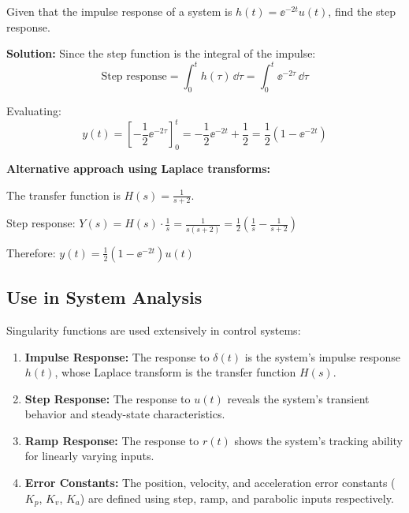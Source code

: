 \begin{examplebox}[title=Example 10.2: Using Singularity Function Relationships]
Given that the impulse response of a system is $h(t) = \ee^{-2t}u(t)$, find the step response.

\textbf{Solution:}
Since the step function is the integral of the impulse:
\begin{equation}
\text{Step response} = \int_0^t h(\tau) \, \dd\tau = \int_0^t \ee^{-2\tau} \, \dd\tau
\end{equation}

Evaluating:
\begin{equation}
y(t) = \left[-\frac{1}{2}\ee^{-2\tau}\right]_0^t = -\frac{1}{2}\ee^{-2t} + \frac{1}{2} = \frac{1}{2}(1 - \ee^{-2t})
\end{equation}

\textbf{Alternative approach using Laplace transforms:}

The transfer function is $H(s) = \frac{1}{s+2}$.

Step response: $Y(s) = H(s) \cdot \frac{1}{s} = \frac{1}{s(s+2)} = \frac{1}{2}\left(\frac{1}{s} - \frac{1}{s+2}\right)$

Therefore: $\boxed{y(t) = \frac{1}{2}(1 - \ee^{-2t})u(t)}$
\end{examplebox}

\subsection{Use in System Analysis}

Singularity functions are used extensively in control systems:

\begin{enumerate}
    \item \textbf{Impulse Response:} The response to $\delta(t)$ is the system's impulse response $h(t)$, whose Laplace transform is the transfer function $H(s)$.

    \item \textbf{Step Response:} The response to $u(t)$ reveals the system's transient behavior and steady-state characteristics.

    \item \textbf{Ramp Response:} The response to $r(t)$ shows the system's tracking ability for linearly varying inputs.

    \item \textbf{Error Constants:} The position, velocity, and acceleration error constants ($K_p$, $K_v$, $K_a$) are defined using step, ramp, and parabolic inputs respectively.
\end{enumerate}

